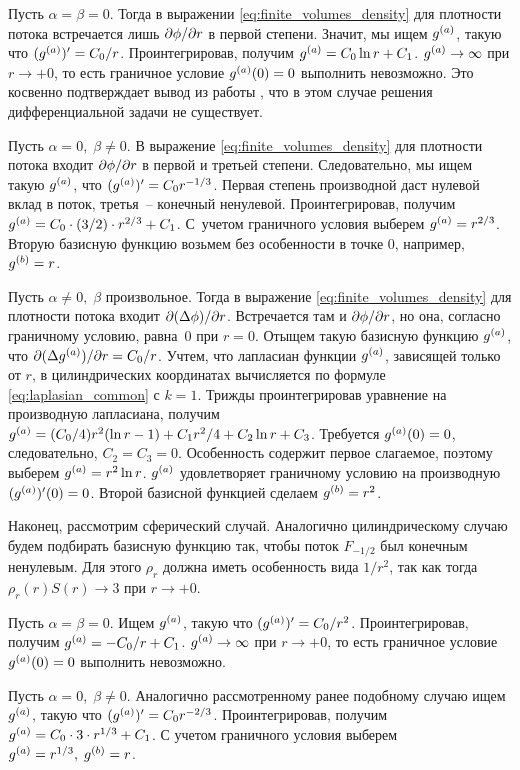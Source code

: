 Пусть $\alpha = \beta = 0$. Тогда в выражении \eqref{eq:finite_volumes_density} для плотности потока встречается лишь $\partial \phi / \partial r$ в первой степени. Значит, мы ищем ${g^{(a)}}$, такую что $(\ga)' \hm = C_0/r$. Проинтегрировав, получим ${g^{(a)}} = C_0 \ln r + C_1$. ${g^{(a)}} \to \infty$ при $r \to +0$, то есть граничное условие ${g^{(a)}}(0) = 0$ выполнить невозможно. Это косвенно подтверждает вывод из работы \cite{zipunova_higher_codimension}, что в этом случае решения дифференциальной задачи не существует.

Пусть $\alpha = 0, \; \beta \neq 0$. В выражение \eqref{eq:finite_volumes_density} для плотности потока входит $\partial \phi / \partial r$ в первой и третьей степени. Следовательно, мы ищем такую ${g^{(a)}}$, что $(\ga)' \hm = C_0 r^{-1/3}$. Первая степень производной даст нулевой вклад в поток, третья~-- конечный ненулевой. Проинтегрировав, получим ${g^{(a)}} = C_0 \cdot (3/2) \cdot r^{2/3} + C_1$. С~учетом граничного условия выберем ${g^{(a)}} = r^{2/3}$. Вторую базисную функцию возьмем без особенности в точке $0$, например, ${g^{(b)}} = r$.

Пусть $\alpha \neq 0, \; \beta$ произвольное. Тогда в выражение \eqref{eq:finite_volumes_density} для плотности потока входит $\partial (\Delta \phi) / \partial r$. Встречается там и $\partial \phi / \partial r$, но она, согласно граничному условию, равна~$0$ при $r = 0$. Отыщем такую базисную функцию ${g^{(a)}}$, что $\partial (\Delta {g^{(a)}}) / \partial r = C_0 / r$. Учтем, что лапласиан функции ${g^{(a)}}$, зависящей только от $r$, в цилиндрических координатах вычисляется по формуле \eqref{eq:laplasian_common} с $k = 1$. Трижды проинтегрировав уравнение на производную лапласиана, получим ${g^{(a)}} = (C_0/4) r^2 (\ln r - 1) + C_1 r^2 / 4 + C_2 \ln r + C_3$. Требуется ${g^{(a)}}(0) = 0$, следовательно, $C_2 = C_3 = 0$. Особенность содержит первое слагаемое, поэтому выберем ${g^{(a)}} = r^2 \ln r$. ${g^{(a)}}$ удовлетворяет граничному условию на производную $({g^{(a)}})'(0) = 0$. Второй базисной функцией сделаем ${g^{(b)}} = r^2$.

Наконец, рассмотрим сферический случай. Аналогично цилиндрическому случаю будем подбирать базисную функцию так, чтобы поток $F_{-1/2}$ был конечным ненулевым. Для этого $\rho_r$ должна иметь особенность вида $1/r^2$, так как тогда $\rho_r(r) S(r) \to 3$ при $r \to +0$.

Пусть $\alpha = \beta = 0$. Ищем ${g^{(a)}}$, такую что $({g^{(a)}})' = C_0 / r^2$. Проинтегрировав, получим ${g^{(a)}} = -C_0 / r + C_1$. ${g^{(a)}} \to \infty$ при $r \to +0$, то есть граничное условие ${g^{(a)}}(0) = 0$ выполнить невозможно.

Пусть $\alpha = 0, \; \beta \neq 0$. Аналогично рассмотренному ранее подобному случаю ищем ${g^{(a)}}$, такую что $({g^{(a)}})' = C_0 r^{-2/3}$. Проинтегрировав, получим $\ga \hm = C_0 \cdot 3 \cdot r^{1/3} + C_1$. С учетом граничного условия выберем ${g^{(a)}} = r^{1/3}, \; {g^{(b)}} = r$.

